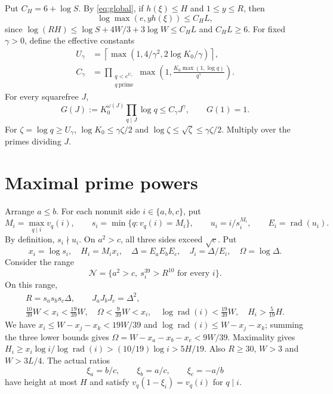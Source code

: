 \documentclass{amsart}
\theoremstyle{remark}
\newcommand{\rad}{\operatorname{rad}}
\numberwithin{equation}{section}
\begin{document}
Put $C_H=6+\log S$.
By \eqref{eq:global}, if $h(\xi)\le H$ and $1\le y\le R$, then
\begin{equation}\label{eq:logheight}
\log\max(e,yh(\xi))\le C_HL,
\end{equation}
since $\log(RH)\le\log S+4W/3+3\log W\le C_HL$ and $C_HL\ge6$.
For fixed $\gamma>0$, define the effective constants
\begin{equation}\label{eq:calpha}
\begin{split}
U_\gamma&=\left\lceil\max(1,4/\gamma^2,2\log K_0/\gamma)\right\rceil,\\
C_\gamma&=\prod_{\substack{q<e^{U_\gamma}\\q\ \mathrm{prime}}}
 \max\left(1,\frac{K_0\max(1,\log q)}{q^\gamma}\right).
\end{split}
\end{equation}
For every squarefree $J$,
\begin{equation}\label{eq:absorbprimes}
G(J):=K_0^{\omega(J)}\prod_{q\mid J}\log q\le C_\gamma J^\gamma,
\qquad G(1)=1.
\end{equation}
For $\zeta=\log q\ge U_\gamma$,
$\log K_0\le\gamma\zeta/2$ and $\log\zeta\le\sqrt\zeta\le\gamma\zeta/2$.
Multiply over the primes dividing $J$.

\section{Maximal prime powers}\label{sec:complement}
Arrange $a\le b$.
For each nonunit side $i\in\{a,b,c\}$, put
\[
M_i=\max_{q\mid i}v_q(i),\qquad
s_i=\min\{q:v_q(i)=M_i\},\qquad
u_i=i/s_i^{M_i},\qquad E_i=\rad(u_i).
\]
By definition, $s_i\nmid u_i$.
On $a^2>c$, all three sides exceed $\sqrt c$.
Put
\[
x_i=\log s_i,\quad H_i=M_ix_i,\quad
\Delta=E_aE_bE_c,\quad J_i=\Delta/E_i,\quad \Omega=\log\Delta.
\]
Consider the range
\begin{equation}\label{eq:N}
\mathcal N=\{a^2>c,\ s_i^{39}>R^{10}\text{ for every }i\}.
\end{equation}
On this range,
\begin{gather}
R=s_as_bs_c\Delta,\qquad J_aJ_bJ_c=\Delta^2,\label{eq:identities}\\
\frac{10}{39}W<x_i<\frac{19}{39}W,\quad
\Omega<\frac9{39}W<x_i,\quad
\log\rad(i)<\frac{19}{39}W,\quad H_i>\frac5{19}H.\label{eq:comparisons}
\end{gather}
We have $x_i\le W-x_j-x_k<19W/39$ and
$\log\rad(i)\le W-x_j-x_k$; summing the three lower bounds gives
$\Omega=W-x_a-x_b-x_c<9W/39$.
Maximality gives
$H_i\ge x_i\log i/\log\rad(i)>(10/19)\log i>5H/19$.
Also $R\ge30$, $W>3$ and $W>3L/4$.
The actual ratios
\begin{equation}\label{eq:ratios}
\xi_a=b/c,\qquad\xi_b=a/c,\qquad\xi_c=-a/b
\end{equation}
have height at most $H$ and satisfy
$v_q(1-\xi_i)=v_q(i)$ for $q\mid i$.
\end{document}
